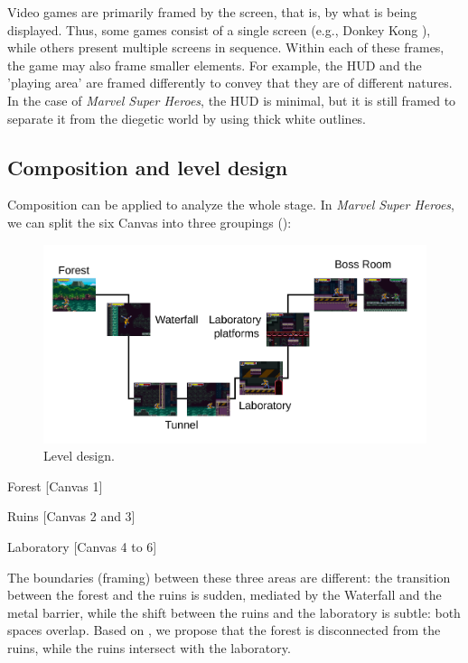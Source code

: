 \documentclass[english]{textolivre}
\begin{document}
Video games are primarily framed by the screen, that is, by what is being displayed. Thus, some games consist of a single screen (e.g., Donkey Kong \cite{nintendo_donkey_1981}), while others present multiple screens in sequence. Within each of these frames, the game may also frame smaller elements. For example, the HUD and the 'playing area' are framed differently to convey that they are of different natures. In the case of \textit{Marvel Super Heroes}, the HUD is minimal, but it is still framed to separate it from the diegetic world by using thick white outlines.

\subsection{Composition and level design}\label{sec-outras-estr}
Composition can be applied to analyze the whole stage. In \textit{Marvel Super Heroes}, we can split the six Canvas into three groupings ():

\begin{figure}[htbp]
 \centering
 \includegraphics[width=\textwidth]{fig-011.png}
 \caption{Level design.}
 \label{fig011}
\end{figure}

Forest [Canvas 1]

Ruins [Canvas 2 and 3]

Laboratory [Canvas 4 to 6]

The boundaries (framing) between these three areas are different: the transition between the forest and the ruins is sudden, mediated by the Waterfall and the metal barrier, while the shift between the ruins and the laboratory is subtle: both spaces overlap. Based on \textcite[p.~13]{van_leeuwen_introducing_2005}, we propose that the forest is disconnected from the ruins, while the ruins intersect with the laboratory.
\end{document}
